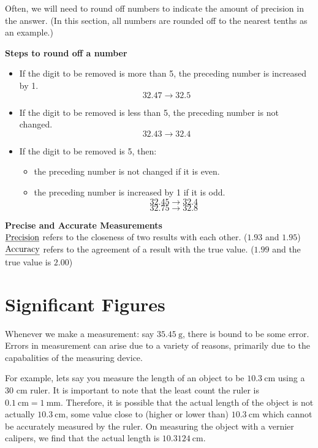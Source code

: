 \documentclass[
  14pt,
]{extarticle}
\providecommand{\tightlist}{%
  \setlength{\itemsep}{0pt}\setlength{\parskip}{0pt}}
\renewenvironment{quote}{\begin{myquote}}{\end{myquote}}
\begin{document}
Often, we will need to round off numbers to indicate the amount of
precision in the answer. (In this section, all numbers are rounded off
to the nearest tenths as an example.)

\textbf{Steps to round off a number}

\begin{itemize}
\item
  If the digit to be removed is more than 5, the preceding number is
  increased by 1. \[32.47\rightarrow 32.5\]
\item
  If the digit to be removed is less than 5, the preceding number is not
  changed. \[32.43\rightarrow 32.4\]
\item
  If the digit to be removed is 5, then:

  \begin{itemize}
  \tightlist
  \item
    the preceding number is not changed if it is even.
  \item
    the preceding number is increased by 1 if it is odd.
    \[32.45\rightarrow 32.4\] \[32.75\rightarrow 32.8\]
  \end{itemize}
\end{itemize}

\begin{quote}
\textbf{Precise and Accurate Measurements}\\
\(\text{\underline{Precision}}\) refers to the closeness of two results
with each other. (\(1.93\) and \(1.95\))\\
\(\text{\underline{Accuracy}}\) refers to the agreement of a result with
the true value. (\(1.99\) and the true value is \(2.00\))
\end{quote}

\hypertarget{significant-figures}{%
\section{Significant Figures}\label{significant-figures}}

Whenever we make a measurement: say \({35.45~\mathrm{g}}\), there is
bound to be some error. Errors in measurement can arise due to a variety
of reasons, primarily due to the capabalities of the measuring device.

For example, lets say you measure the length of an object to be
\({10.3~\mathrm{cm}}\) using a 30 cm ruler. It is important to note that
the least count the ruler is \({0.1~\mathrm{cm}} ={1~\mathrm{mm}}\).
Therefore, it is possible that the actual length of the object is not
actually \({10.3~\mathrm{cm}}\), some value close to (higher or lower
than) \({10.3~\mathrm{cm}}\) which cannot be accurately measured by the
ruler. On measuring the object with a vernier calipers, we find that the
actual length is \({10.3124~\mathrm{cm}}\).
\end{document}
